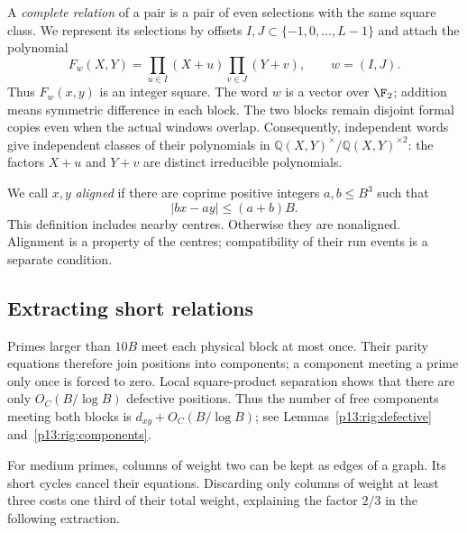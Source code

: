 A \emph{complete relation} of a pair is a pair of even selections
with the same square class.  We represent its selections by offsets
$I,J\subset\{-1,0,\ldots,L-1\}$ and attach the polynomial
\begin{equation}
 F_w(X,Y)=\prod_{u\in I}(X+u)\prod_{v\in J}(Y+v),
 \qquad w=(I,J).
 \label{p13:rig:word-polynomial}
\end{equation}
Thus $F_w(x,y)$ is an integer square.  The word $w$ is a vector
over $\F_2$; addition means symmetric difference in each block.
The two blocks remain disjoint formal copies even when the actual
windows overlap.  Consequently, independent words give independent
classes of their polynomials in
$\mathbb Q(X,Y)^\times/\mathbb Q(X,Y)^{\times2}$: the factors
$X+u$ and $Y+v$ are distinct irreducible polynomials.

We call $x,y$ \emph{aligned} if there are coprime positive integers
$a,b\le B^3$ such that
\begin{equation}
                   |bx-ay|\le(a+b)B.
 \label{p13:rig:alignment}
\end{equation}
This definition includes nearby centres.  Otherwise they are
nonaligned.  Alignment is a property of the centres; compatibility
of their run events is a separate condition.


\subsection{Extracting short relations}

Primes larger than $10B$ meet each physical block at most once.  Their
parity equations therefore join positions into components; a component
meeting a prime only once is forced to zero.  Local square-product
separation shows that there are only $O_C(B/\log B)$ defective
positions.  Thus the number of free components meeting both blocks is
$d_{xy}+O_C(B/\log B)$; see
Lemmas~\ref{p13:rig:defective} and~\ref{p13:rig:components}.

For medium primes, columns of weight two can be kept as edges of a
graph.  Its short cycles cancel their equations.  Discarding only
columns of weight at least three costs one third of their total
weight, explaining the factor $2/3$ in the following extraction.

